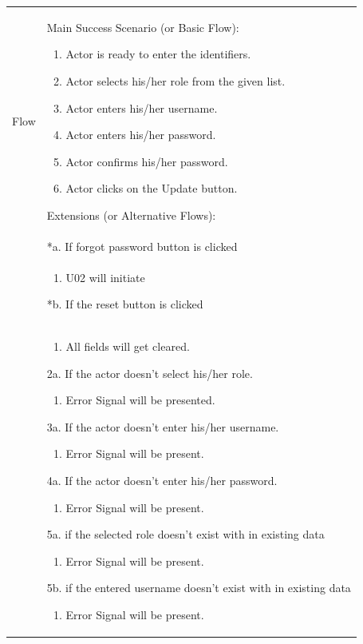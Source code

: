 \documentclass[12pt,a4paper]{report}
\begin{document}
\begin{tabular}{ | m{3cm} | m{12cm}| } \hline
Flow & Main Success Scenario (or Basic Flow):
\begin{enumerate}
\item Actor is ready to enter the identifiers.
\item Actor selects his/her role from the given list.   
\item Actor enters his/her username.
\item Actor enters his/her password.
\item Actor confirms his/her password.
\item Actor clicks on the Update button.
\end{enumerate}
Extensions (or Alternative Flows):\\
& *a. If forgot password button is clicked \\
& \begin{enumerate}
		\item U02 will initiate
	\end{enumerate}
*b. If the reset button is clicked \\
&	\begin{enumerate}
		\item All fields will get cleared.
	\end{enumerate}

2a. If the actor doesn't select his/her role.
 	\begin{enumerate}
		\item Error Signal will be presented.
	\end{enumerate}
3a. If the actor doesn't enter his/her username.
 	\begin{enumerate}
		\item Error Signal will be present.
	\end{enumerate}
4a. If the actor doesn't enter his/her password.
 	\begin{enumerate}
		\item Error Signal will be present.
	\end{enumerate}

5a. if the selected role doesn't exist with in existing data
	\begin{enumerate}
		\item Error Signal will be present.
	\end{enumerate}
5b. if the entered username doesn't exist with in existing data
	\begin{enumerate}
		\item Error Signal will be present.
	\end{enumerate}
\\ \hline
\end{tabular}
\end{document}
